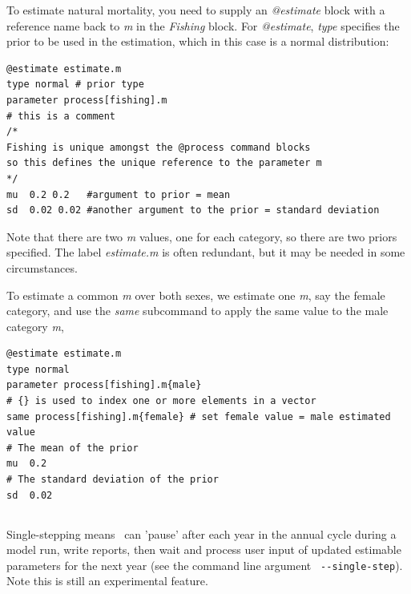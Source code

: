 To estimate natural mortality, you need to supply an \textit{@estimate} block with a reference name back to \textit{m} in the \textit{Fishing} block. For \textit{@estimate}, \textit{type} specifies the prior to be used in the estimation, which in this case is a normal distribution:

{\small{\begin{verbatim}
@estimate estimate.m
type normal # prior type
parameter process[fishing].m  
# this is a comment
/*
Fishing is unique amongst the @process command blocks
so this defines the unique reference to the parameter m
*/
mu  0.2 0.2   #argument to prior = mean
sd  0.02 0.02 #another argument to the prior = standard deviation
\end{verbatim}}}

Note that there are two \textit{m} values, one for each category, so there are two priors specified. The \textit{\@estimate} label \textit{estimate.m} is often redundant, but it may be needed in some circumstances.

To estimate a common \textit{m} over both sexes, we estimate one \textit{m}, say the female category, and use the \textit{same} subcommand to apply the same value to the male category \textit{m},

{\small{\begin{verbatim}
@estimate estimate.m
type normal
parameter process[fishing].m{male}
# {} is used to index one or more elements in a vector
same process[fishing].m{female} # set female value = male estimated value
# The mean of the prior
mu  0.2
# The standard deviation of the prior
sd  0.02
\end{verbatim}}}


\subsection{\label{sec:SingleStepping}}



Single-stepping means \CNAME\ can 'pause' after each year in the annual cycle during a model run, write reports, then wait and process user input of updated estimable parameters for the next year (see the command line argument \texttt{ -{}-single-step}). Note this is still an experimental feature.


